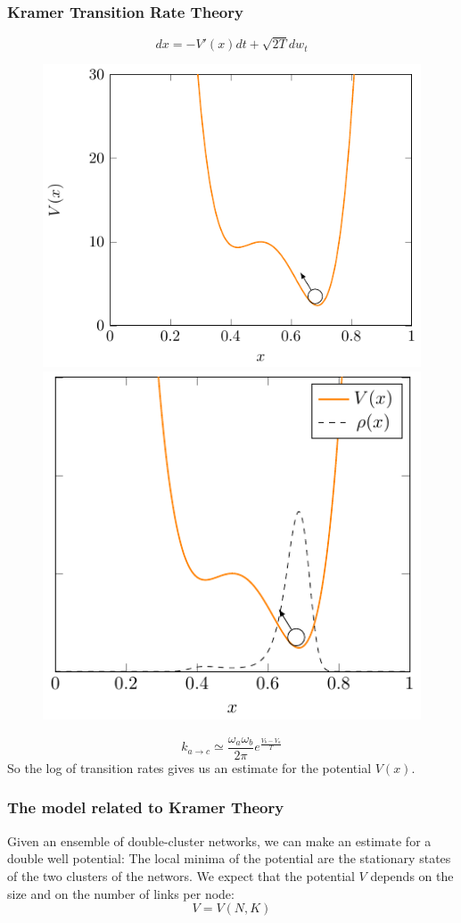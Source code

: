 \documentclass{beamer}
\begin{document}
\begin{frame}
\frametitle{Kramer Transition Rate Theory}
$$
dx = -V'(x)dt + \sqrt{2T} dw_t
$$
\begin{figure}
\includegraphics[scale=0.5]{images/kramerwell.pdf}
\includegraphics[scale=0.5]{images/kramerpot.pdf}

\end{figure}
$$
k_{a\to c} \simeq \frac{\omega_a \omega_b}{2 \pi} e^{\frac{V_b-V_a}{T}}
$$
So the log of transition rates gives us an estimate for the potential $V(x)$.
\end{frame}


\begin{frame}
\frametitle{The model related to Kramer Theory}
Given an ensemble of double-cluster networks, we can make an estimate for a double well potential: The local minima of the potential are the stationary states of the two clusters of the networs. We expect that the potential $V$ depends on the size and on the number of links per node:
$$
V = V(N,K)
$$
\end{frame}
\end{document}
